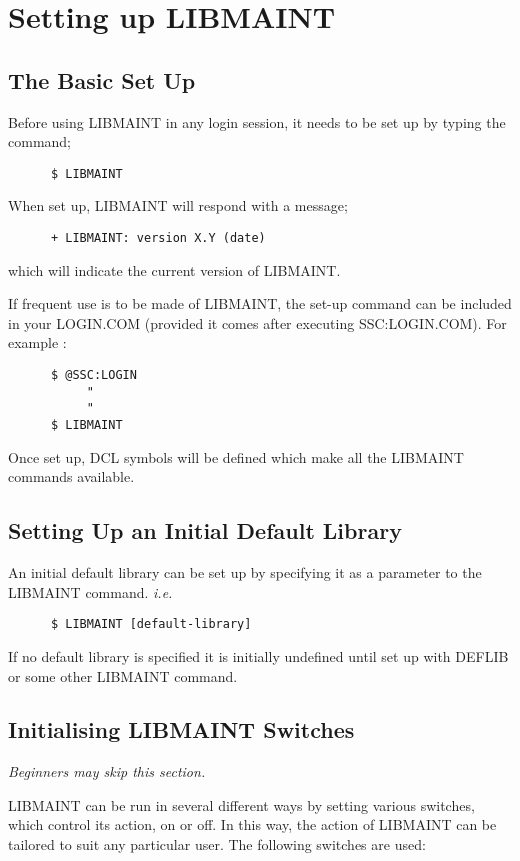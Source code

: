 \section{Setting up LIBMAINT}

\subsection{The Basic Set Up}

Before using LIBMAINT in any login session, it needs to be set up
by typing the command;
\begin{verbatim}
      $ LIBMAINT
\end{verbatim}
When set up, LIBMAINT will respond with a message;
\begin{verbatim}
      + LIBMAINT: version X.Y (date)
\end{verbatim}
which will indicate the current version of LIBMAINT.

If frequent use is to be made of LIBMAINT, the set-up command can be
included in your LOGIN.COM (provided it comes after executing
SSC:LOGIN.COM). For example :
\begin{verbatim}
      $ @SSC:LOGIN
           "
           "
      $ LIBMAINT
\end{verbatim}
Once set up, DCL symbols will be defined which make all the LIBMAINT
commands available.

\subsection{Setting Up an Initial Default Library}

An initial default library can be set up by specifying it
as a parameter to the LIBMAINT command. {\it i.e.}
\begin{verbatim}
      $ LIBMAINT [default-library]
\end{verbatim}
If no default library is specified it is initially undefined
until set up with DEFLIB or some other LIBMAINT command.

\subsection{Initialising LIBMAINT Switches}

{\it Beginners may skip this section.}

LIBMAINT can be run in several different ways by setting various
switches, which control its action, on or off.
In this way, the action of LIBMAINT can be tailored to suit any
particular user.
The following switches are used:

